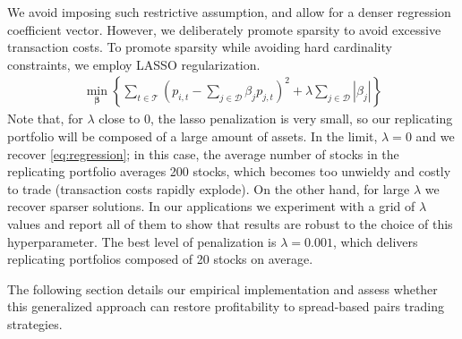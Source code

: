 We avoid imposing such restrictive assumption, and allow for a denser regression coefficient vector. However, we deliberately promote sparsity to avoid excessive transaction costs. To promote sparsity while avoiding hard cardinality constraints, we employ LASSO regularization. 
\begin{align}
\label{eq:lasso}
\min_{\boldsymbol \beta} 
\left\{ 
\sum_{t\in\mathcal T} \left( 
p_{i,t} - \sum_{j \in \mathcal{D}} \beta_j p_{j,t} 
\right)^2 
+ 
\lambda \sum_{j \in \mathcal{D}} |\beta_j| 
\right\}
\end{align}
Note that, for $\lambda$ close to 0, the lasso penalization is very small, so our replicating portfolio will be composed of a large amount of assets. In the limit, $\lambda=0$ and we recover \cref{eq:regression}; in this case, the average number of stocks in the replicating portfolio averages 200 stocks, which becomes too unwieldy and costly to trade (transaction costs rapidly explode). On the other hand, for large $\lambda$ we recover sparser solutions. In our applications we experiment with a grid of $\lambda$ values and report all of them to show that results are robust to the choice of this hyperparameter. The best level of penalization is $\lambda=0.001$, which delivers replicating portfolios composed of 20 stocks on average. 
 

 The following section details our empirical implementation and assess whether this generalized approach can restore profitability to spread-based pairs trading strategies.

